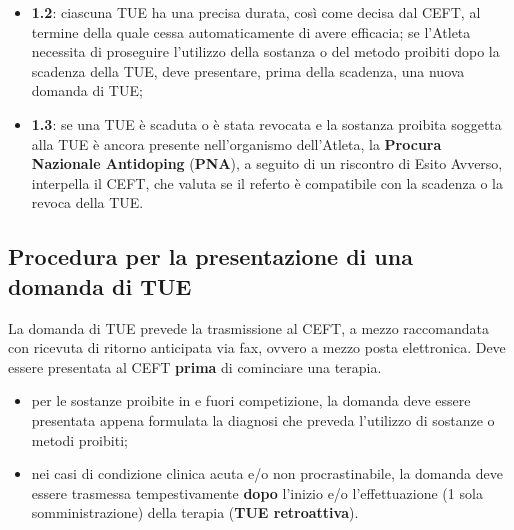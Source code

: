 \begin{itemize}
  \item \textbf{1.2}: ciascuna TUE ha una precisa durata, così come decisa dal CEFT, al termine
    della quale cessa automaticamente di avere efficacia; se l'Atleta necessita di proseguire
    l'utilizzo della sostanza o del metodo proibiti dopo la scadenza della TUE, deve presentare,
    prima della scadenza, una nuova domanda di TUE;
  \item \textbf{1.3}: se una TUE è scaduta o è stata revocata e la sostanza proibita soggetta
    alla TUE è ancora presente nell'organismo dell'Atleta, la \textbf{Procura Nazionale
    Antidoping} (\textbf{PNA}), a seguito di un riscontro di Esito Avverso, interpella il CEFT,
    che valuta se il referto è compatibile con la scadenza o la revoca della TUE.
\end{itemize}

\subsection{Procedura per la presentazione di una domanda di TUE}

La domanda di TUE prevede la trasmissione al CEFT, a mezzo raccomandata con ricevuta di ritorno
anticipata via fax, ovvero a mezzo posta elettronica. Deve essere presentata al CEFT
\textbf{prima} di cominciare una terapia.
\begin{itemize}
  \item per le sostanze proibite in e fuori competizione, la domanda deve essere presentata
    appena formulata la diagnosi che preveda l'utilizzo di sostanze o metodi proibiti;
  \item nei casi di condizione clinica acuta e/o non procrastinabile, la domanda deve essere
    trasmessa tempestivamente \textbf{dopo} l'inizio e/o l'effettuazione (1 sola
    somministrazione) della terapia (\textbf{TUE retroattiva}).
\end{itemize}

